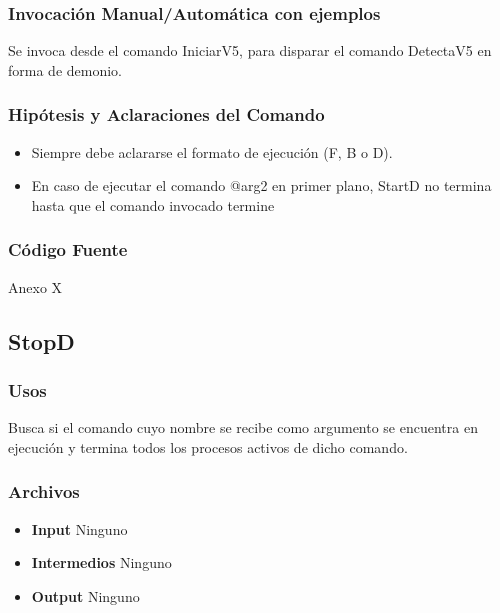 \documentclass[a4paper,10pt,titlepage]{article}
\begin{document}
		\subsubsection{Invocaci\'on Manual/Autom\'atica con ejemplos}
			Se invoca desde el comando IniciarV5, para disparar el comando DetectaV5 en forma de demonio.
				
		\subsubsection{Hip\'otesis y Aclaraciones del Comando}
			\begin{itemize}
				\item {}{Siempre debe aclararse el formato de ejecuci\'on (F, B o D).}
				\item{}{En caso de ejecutar el comando @arg2 en primer plano, StartD no termina hasta que el comando invocado termine}

			\end{itemize}

		\subsubsection{C\'odigo Fuente}
			Anexo X


	\subsection{StopD}
		\subsubsection{Usos}

		Busca si el comando cuyo nombre se recibe como argumento se encuentra en ejecuci\'on y termina todos los procesos activos de dicho comando.


		\subsubsection{Archivos}
			\begin {itemize}
				\item \textbf{Input } {Ninguno}
				\item \textbf{Intermedios } {Ninguno}
				\item \textbf{Output } {Ninguno}
			\end{itemize}
\end{document}
